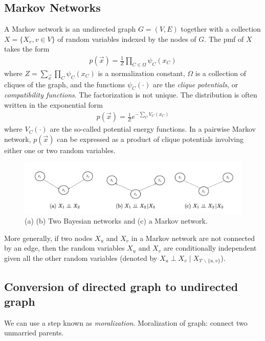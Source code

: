 \documentclass[11pt,a4paper]{article}
\begin{document}
\subsection{Markov Networks}
A Markov network is an undirected graph $G = (V,E)$ together with a collection $X = \{X_v, v \in V\}$ of random variables indexed by the nodes of $G$. The pmf of $X$ takes the form
\begin{equation}
    \begin{aligned}
        p(\vec{x})=\frac{1}{Z}\prod_{C\in \Omega}\psi_C(x_C)
    \end{aligned}
    \nonumber
\end{equation}
where $Z=\sum_{\vec{x}}\prod_{C}\psi_C(x_C)$ is a normalization constant, $\Omega$ is a collection of cliques of the graph, and the functions $\psi_C(\cdot)$ are the \textit{clique potentials}, or \textit{compatibility functions}. The factorization is not unique. The distribution is often written in the exponential form
\begin{equation}
    \begin{aligned}
        p(\vec{x})=\frac{1}{Z}e^{-\sum_CV_C(x_C)}
    \end{aligned}
    \nonumber
\end{equation}
where $V_C(\cdot)$ are the so-called potential energy functions. In a pairwise Markov network, $p(\vec{x})$ can be expressed as a product of clique potentials involving either one or two random variables.

\begin{center}\begin{figure}[htbp]
    \centering
    \includegraphics[scale=0.2]{BM.png}
    \caption{(a) (b) Two Bayesian networks and (c) a Markov network.}
    \label{}
\end{figure}\end{center}
More generally, if two nodes $X_u$ and $X_v$ in a Markov network are not connected by an edge, then the random variables $X_u$ and $X_v$ are conditionally independent given all the other random variables (denoted by $X_u \perp X_v \mid X_{\mathcal{V} \backslash\{u, v\}}$).

\subsection{Conversion of directed graph to undirected graph}
We can use a step known as \textit{moralization}.
Moralization of graph: connect two unmarried parents.
\end{document}
